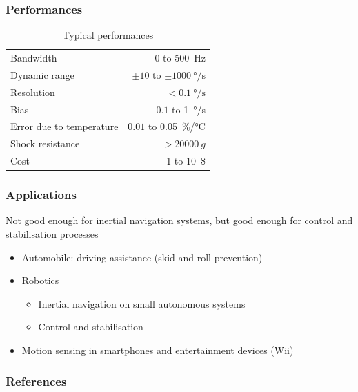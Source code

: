 \documentclass[10pt]{beamer}
\begin{document}
\begin{frame}
\frametitle{Performances}
    \begin{table}
    \begin{tabular}{lr}
        \toprule
        Bandwidth                   & 0 to \SI{500}{\hertz} \\
        Dynamic range               & $\pm 10$ to $\pm \SI{1000}{\degree/\second}$ \\
        Resolution                  & $< \SI{0.1}{\degree/\second}$ \\
        Bias                        & $0.1$ to \SI{1}{\degree/\second} \\
        Error due to temperature    & $0.01$ to \SI{0.05}{\%/\celsius} \\
        Shock resistance            & $> \SI{20000}{g}$ \\
        Cost                        & 1 to \SI{10}{\$} \\
        \bottomrule
    \end{tabular}
    \caption{Typical performances}
    \end{table}
\end{frame}

\begin{frame}
\frametitle{Applications}
    Not good enough for inertial navigation systems, but good enough for control and stabilisation processes
    \begin{itemize}
        \item Automobile: driving assistance (skid and roll prevention)
        \item Robotics
        \begin{itemize}
            \item Inertial navigation on small autonomous systems
            \item Control and stabilisation
        \end{itemize}
        \item Motion sensing in smartphones and entertainment devices (Wii)
    \end{itemize}
\end{frame}


\begin{frame}[allowframebreaks]
\frametitle{References}
    
    
\end{frame}

\end{document}
